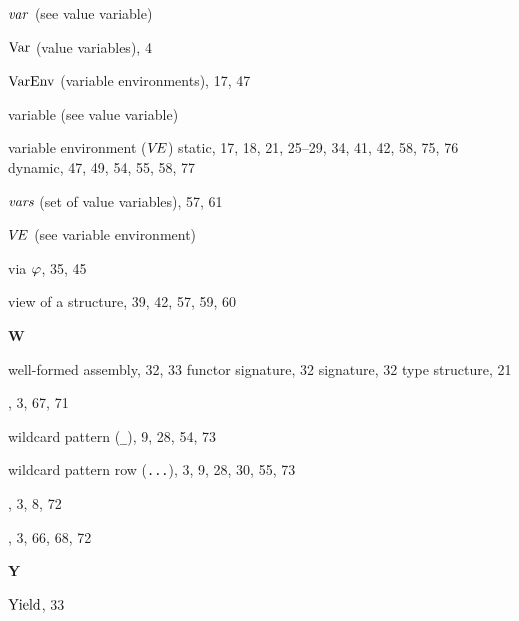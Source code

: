 \begin{theindex}
\item ${\it var}$ (see value variable) 
\item ${\rm Var}$ (value variables), 4
\item ${\rm VarEnv}$ (variable environments), 17, 47
\item variable (see value variable) 
\item variable environment ($\mbox{$V\!E$}$) 
\subitem static, 17, 18, 21, 25--29, 34, 41, 42, 58, 75, 76
\subitem dynamic, 47, 49, 54, 55, 58, 77
\item $\mbox{\it vars}$ (set of value variables), 57, 61
\item $\mbox{$V\!E$}$ (see variable environment) 
\item via $\varphi$, 35, 45
\item view of a structure, 39, 42, 57, 59, 60
\indexspace
\parbox{65mm}{\hfil{\large\bf W}\hfil}
\indexspace
\item well-formed 
\subitem assembly, 32, 33
\subitem functor signature, 32
\subitem signature, 32
\subitem type structure, 21
\item \WHILE, 3, 67, 71
\item wildcard pattern (\verb+_+), 9, 28, 54, 73
\item wildcard pattern row (\verb+...+), 3, 9, 28, 30, 55, 73
\item \WITH, 3, 8, 72
\item \WITHTYPE, 3, 66, 68, 72
\indexspace
\parbox{65mm}{\hfil{\large\bf Y}\hfil}
\indexspace
\item $\mathop{\rm Yield}\nolimits$, 33
\end{theindex}